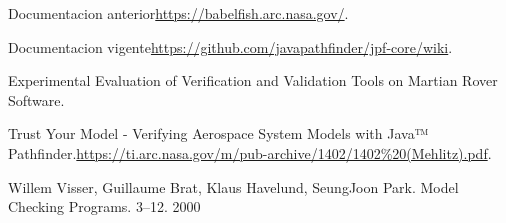 \documentclass[runningheads]{llncs}
\begin{document}
%
%
%
% 
% 
%
\begin{thebibliography}{8}
Documentacion anterior\url{https://babelfish.arc.nasa.gov/}.

Documentacion vigente\url{https://github.com/javapathfinder/jpf-core/wiki}.

Experimental Evaluation of Verification and Validation Tools on Martian Rover Software.

Trust Your Model - Verifying Aerospace System Models with Java™ Pathfinder.\url{https://ti.arc.nasa.gov/m/pub-archive/1402/1402\%20(Mehlitz).pdf}.

Willem Visser, Guillaume Brat, Klaus Havelund, SeungJoon Park. Model Checking
Programs. 3–12. 2000

\end{thebibliography}
\end{document}
